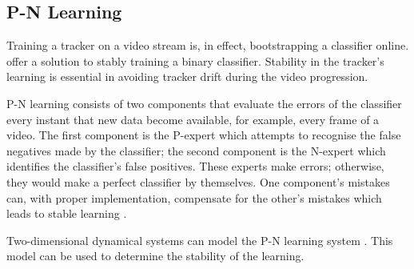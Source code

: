 \subsection{P-N Learning} \label{sec:pnlearning}
  Training a tracker on a video stream is, in effect, bootstrapping a classifier online.
  \citet{PNLearning} offer a solution to stably training a binary classifier.
  Stability in the tracker's learning is essential in avoiding tracker drift during the video progression.

  P-N learning consists of two components that evaluate the errors of the classifier every instant that new data become available, for example, every frame of a video.
  The first component is the P-expert which attempts to recognise the false negatives made by the classifier; the second component is the N-expert which identifies the classifier's false positives.
  These experts make errors; otherwise, they would make a perfect classifier by themselves.
  One component's mistakes can, with proper implementation, compensate for the other's mistakes which leads to stable learning \cite{Kalal2011}.

  Two-dimensional dynamical systems can model the P-N learning system \citep{PNLearning}.
  This model can be used to determine the stability of the learning.
